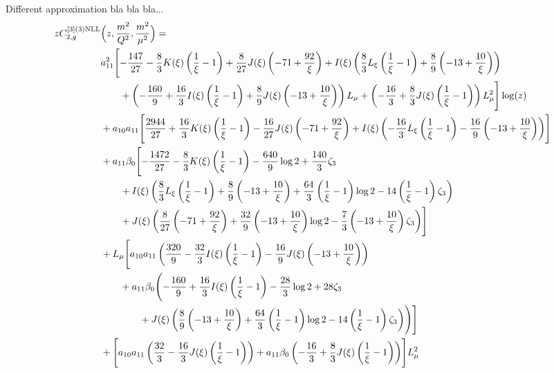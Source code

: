 \documentclass[a4paper]{article}
\begin{document}
Different approximation bla bla bla...
\begin{equation}
	\begin{split}
		z C_{2,g}^{[3](3) \rm NLL}&\Bigl(z,\frac{m^2}{Q^2},\frac{m^2}{\mu^2}\Bigr)= \\
		& a_{11}^2\Biggl[-\frac{147}{27} - \frac{8}{3} K(\xi) \left(\frac{1}{\xi}-1\right) + \frac{8}{27} J(\xi) \left(-71 + \frac{92}{\xi}\right) + I(\xi) \left(\frac{8}{3} L_\xi \left(\frac{1}{\xi}-1\right) + \frac{8}{9} \left(-13 + \frac{10}{\xi}\right)\right) \\
		& \qquad + \left(-\frac{160}{9} + \frac{16}{3} I(\xi) \left(\frac{1}{\xi}-1\right) + \frac{8}{9} J(\xi) \left(-13 + \frac{10}{\xi}\right)\right) L_\mu + \left(-\frac{16}{3} + \frac{8}{3} J(\xi) \left(\frac{1}{\xi}-1\right)\right) L_\mu^2\Biggr] \log(z) \\
		& + a_{10} a_{11} \Biggl[\frac{2944}{27} + \frac{16}{3} K(\xi) \left(\frac{1}{\xi} - 1\right) - \frac{16}{27} J(\xi) \left(-71 + \frac{92}{\xi}\right) + I(\xi) \left(-\frac{16}{3} L_\xi \left(\frac{1}{\xi} - 1\right) - \frac{16}{9} \left(-13 + \frac{10}{\xi}\right)\right) \Biggr] \\
		& + a_{11} \beta_0 \Biggl[ -\frac{1472}{27} - \frac{8}{3} K(\xi) \left(\frac{1}{\xi} - 1\right) - \frac{640}{9} \log 2 + \frac{140}{3} \zeta_3 \\
		& \qquad + I(\xi) \left(\frac{8}{3} L_\xi \left(\frac{1}{\xi} - 1\right) + \frac{8}{9} \left(-13 + \frac{10}{\xi}\right) + \frac{64}{3} \left(\frac{1}{\xi} - 1\right) \log 2 - 14 \left(\frac{1}{\xi} - 1\right) \zeta_3\right) \\
		& \qquad + J(\xi) \left(\frac{8}{27} \left(-71 + \frac{92}{\xi}\right) + \frac{32}{9} \left(-13 + \frac{10}{\xi}\right) \log 2 - \frac{7}{3} \left(-13 + \frac{10}{\xi}\right) \zeta_3 \right)\Biggr] \\
		& + L_\mu \Biggl[a_{10} a_{11} \left(\frac{320}{9} - \frac{32}{3} I(\xi) \left(\frac{1}{\xi} - 1\right) - \frac{16}{9} J(\xi) \left(-13 + \frac{10}{\xi}\right)\right) \\
		& \qquad + a_{11} \beta_0 \Biggl(-\frac{160}{9} + \frac{16}{3} I(\xi) \left(\frac{1}{\xi} - 1\right) - \frac{28}{3} \log 2 + 28 \zeta_3 \\
		& \qquad \qquad+ J(\xi) \left(\frac{8}{9} \left(-13 + \frac{10}{\xi}\right) + \frac{64}{3} \left(\frac{1}{\xi} - 1\right) \log 2 - 14 \left(\frac{1}{\xi} - 1\right) \zeta_3 \right)\Biggr)\Biggr]\\
		& + \Biggl[a_{10} a_{11} \left(\frac{32}{3} - \frac{16}{3} J(\xi) \left(\frac{1}{\xi} - 1\right)\right) + a_{11} \beta_0 \left(-\frac{16}{3} + \frac{8}{3} J(\xi) \left(\frac{1}{\xi} - 1\right)\right)\Biggr] L_\mu^2
	\end{split}
\end{equation}
\end{document}
